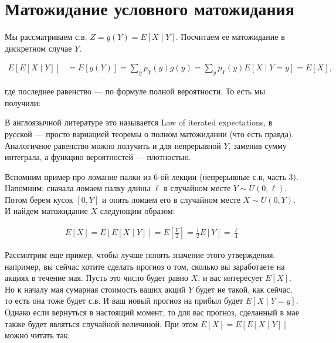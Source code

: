 \documentclass[12pt]{article}
\begin{document}
\section{Матожидание условного матожидания}

Мы рассматриваем с.в. $Z = g(Y) = E[X \mid Y]$. Посчитаем ее матожидание в дискретном случае $Y$.

\begin{align*}
  E[E[X \mid Y]] &= E[g(Y)] = \sum_y p_Y(y) g(y) = \sum_y p_Y(y) E[X \mid Y = y] = E[X],
\end{align*}

где последнее равенство --- по формуле полной вероятности. То есть мы получили:
\begin{center}
\end{center}

В англоязычной литературе это называется Law of iterated expectations, в русской --- просто вариацией теоремы о полном матожидании (что есть правда). Аналогичное равенство можно получить и для непрерывной $Y$, заменив сумму интеграла, а функцию вероятностей --- плотностью.

Вспомним пример про ломание палки из 6-ой лекции (непрерывные с.в, часть 3). Напомним: сначала ломаем палку длины $\ell$ в случайном месте $Y \sim U(0, \ell)$. Потом берем кусок $[0, Y]$ и опять ломаем его в случайном месте $X \sim U(0, Y)$. И найдем матожидание $X$ следующим образом:

\begin{align*}
  E[X] = E[E[X \mid Y]] = E\left[\frac{Y}{2}\right] = \frac{1}{2}E[Y] = \frac{\ell}{4}
\end{align*}

Рассмотрим еще пример, чтобы лучше понять значение этого утверждения. например, вы сейчас хотите сделать прогноз о том, сколько вы заработаете на акциях в течение мая. Пусть это число будет равно $X$, и вас интересует $E[X]$. Но к началу мая сумарная стоимость ваших акций $Y$ будет не такой, как сейчас, то есть она тоже будет с.в. И ваш новый прогноз на прибыл будет $E[X \mid Y = y]$. Однако если вернуться в настоящий момент, то для вас прогноз, сделанный в мае также будет являться случайной величиной. При этом $E[X] = E[E[X \mid Y]]$ можно читать так:
\end{document}
